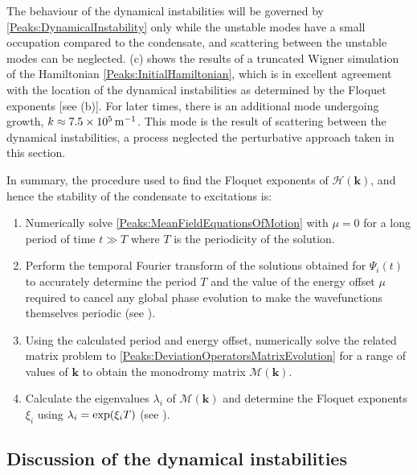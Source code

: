 The behaviour of the dynamical instabilities will be governed by \eqref{Peaks:DynamicalInstability} only while the unstable modes have a small occupation compared to the condensate, and scattering between the unstable modes can be neglected. (c) shows the results of a truncated Wigner simulation of the Hamiltonian \eqref{Peaks:InitialHamiltonian}, which is in excellent agreement with the location of the dynamical instabilities as determined by the Floquet exponents [see (b)]. For later times, there is an additional mode undergoing growth, $k \approx \unit[7.5\times 10^5]{m}^{-1}$. This mode is the result of scattering between the dynamical instabilities, a process neglected the perturbative approach taken in this section. 

\parasep

In summary, the procedure used to find the Floquet exponents of $\mathcal{H}(\bm{k})$, and hence the stability of the condensate to excitations is:
\begin{enumerate}
    \item Numerically solve \eqref{Peaks:MeanFieldEquationsOfMotion} with $\mu=0$ for a long period of time $t \gg T$ where $T$ is the periodicity of the solution.
    \item Perform the temporal Fourier transform of the solutions obtained for $\Psi_i(t)$ to accurately determine the period $T$ and the value of the energy offset $\mu$ required to cancel any global phase evolution to make the wavefunctions themselves periodic (see ).
    \item Using the calculated period and energy offset, numerically solve the related matrix problem to \eqref{Peaks:DeviationOperatorsMatrixEvolution} for a range of values of $\bm{k}$ to obtain the monodromy matrix $\mathcal{M}(\bm{k})$.
    \item Calculate the eigenvalues $\lambda_i$ of $\mathcal{M}(\bm{k})$ and determine the Floquet exponents $\xi_i$ using $\protect{\lambda_i = \exp(\xi_i T)}$ (see ).
\end{enumerate}

\subsection{Discussion of the dynamical instabilities}

